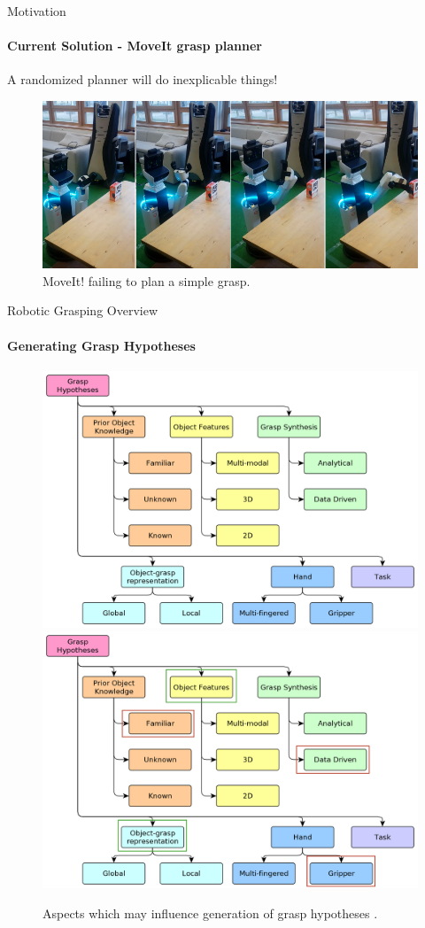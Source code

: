 \documentclass{beamer}
\begin{document}
\begin{frame}{Motivation}
    \framesubtitle{Current Solution - MoveIt grasp planner}%
    A randomized planner will do inexplicable things!
    \begin{figure}[b]
        \centering
        \includegraphics[width=\linewidth]{grasp_moveit_fail}
        \caption{MoveIt! failing to plan a simple grasp.}
    \end{figure}
\end{frame}

\begin{frame}[label=grasp_aspects]{Robotic Grasping Overview}
    \framesubtitle{Generating Grasp Hypotheses}
    \begin{figure}[t]
        \centering
        \begin{overprint}
            \includegraphics[width=0.85\linewidth]{bohg14-grasp_synthesis_mind_map}
            \includegraphics[width=0.85\linewidth]{bohg14-grasp_synthesis_mind_map_marked}
        \end{overprint}
        \caption{Aspects which may influence generation of grasp hypotheses \cite{Bohg2014}.}
    \end{figure}
\end{frame}
\end{document}
